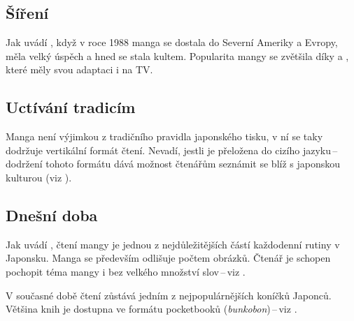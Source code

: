 \documentclass[12pt, a4paper]{article}
\begin{document}
\subsection{Šíření}
Jak uvádí \cite{Gyllenfjell2013}, když v roce 1988 manga  se dostala do Severní Ameriky a Evropy, měla velký úspěch a hned se stala kultem. Popularita mangy se zvětšila díky  a , které měly svou adaptaci i na TV.

\subsection{Uctívání tradicím}
Manga není výjimkou z tradičního pravidla japonského tisku, v ní se taky dodržuje vertikální formát čtení. Nevadí, jestli je přeložena do cizího jazyku\,--\,dodržení tohoto formátu dává možnost čtenářům seznámit se blíž s japonskou kulturou (viz \cite{Naveen2021}).

\subsection{Dnešní doba}
Jak uvádí \cite{Macwilliams2014}, čtení mangy je jednou z nejdůležitějších částí každodenní rutiny v Japonsku. Manga se především odlišuje počtem obrázků. Čtenář je schopen pochopit téma mangy i bez velkého množství slov\,--\,viz \cite{Ito2020}.

V současné době čtení zůstává jedním z nejpopulárnějších koníčků Japonců. Většina knih je dostupna ve formátu pocketbooků (\emph{bunkobon})\,--\,viz \cite{Andrew2011}.

\newpage
\renewcommand{\refname}{Literatura}


\end{document}
